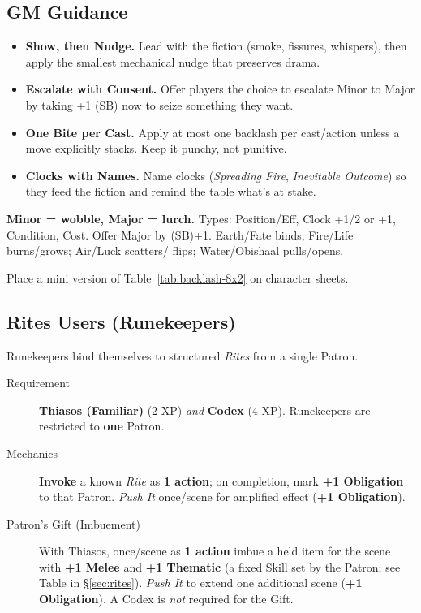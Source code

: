 \subsection*{GM Guidance}\label{subsec:backlash-gm}
\begin{itemize}
\item \textbf{Show, then Nudge.} Lead with the fiction (smoke, fissures, whispers), then apply the smallest mechanical nudge that preserves drama.
\item \textbf{Escalate with Consent.} Offer players the choice to escalate Minor to Major by taking +1 (SB) now to seize something they want.
\item \textbf{One Bite per Cast.} Apply at most one backlash per cast/action unless a move explicitly stacks. Keep it punchy, not punitive.
\item \textbf{Clocks with Names.} Name clocks (\emph{Spreading Fire}, \emph{Inevitable Outcome}) so they feed the fiction and remind the table what's at stake.
\end{itemize}

\begin{tcolorbox}[title={Backlash Cheatsheet (margin-ready)},colback=gray!5,colframe=black]
\small \textbf{Minor = wobble, Major = lurch.} Types: Position/Eff, Clock +1/2 or +1, Condition, Cost. Offer Major by (SB)+1. Earth/Fate binds; Fire/Life burns/grows; Air/Luck scatters/ flips; Water/Obishaal pulls/opens.\par\smallskip
Place a mini version of Table~\ref{tab:backlash-8x2} on character sheets.
\end{tcolorbox}

\subsection{Rites Users (Runekeepers)}
\label{subsec:runekeepers}

Runekeepers bind themselves to structured \emph{Rites} from a single Patron.

\begin{description}
\item[Requirement] \textbf{Thiasos (Familiar)} (2 XP) \emph{and} \textbf{Codex} (4 XP). Runekeepers are restricted to \textbf{one} Patron.
\item[Mechanics] \textbf{Invoke} a known \emph{Rite} as \textbf{1 action}; on completion, mark \textbf{+1 Obligation} to that Patron. \emph{Push It} once/scene for amplified effect (\textbf{+1 Obligation}).
\item[Patron's Gift (Imbuement)] With Thiasos, once/scene as \textbf{1 action} imbue a held item for the scene with \textbf{+1 Melee} and \textbf{+1 Thematic} (a fixed Skill set by the Patron; see Table in \S\ref{sec:rites}). \emph{Push It} to extend one additional scene (\textbf{+1 Obligation}). A Codex is \emph{not} required for the Gift.
\end{description}

